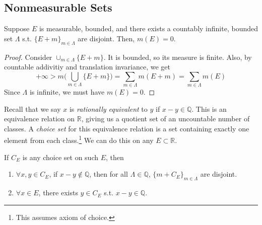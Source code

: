\subsection{Nonmeasurable Sets} 

  \begin{lemma}
    Suppose $E$ is measurable, bounded, and there exists a countably infinite, bounded set $\Lambda$ s.t. $\{E + m\}_{m\in \Lambda}$ are disjoint. Then, $m(E) = 0$. 
  \end{lemma}
  \begin{proof}
    Consider $\cup_{m\in \Lambda} \{E + m\}$. It is bounded, so its measure is finite. Also, by countable addivitiy and translation invariance, we get 
    \begin{equation}
      +\infty > m \bigg( \bigcup_{m\in \Lambda} \{E + m\} \bigg) = \sum_{m\in \Lambda} m (E + m) = \sum_{m\in \Lambda} m(E)
    \end{equation}
    Since $\Lambda$ is infinite, we must have $m(E) = 0$. 
  \end{proof}

  Recall that we say $x$ is \textit{rationally equivalent} to $y$ if $x - y \in \mathbb{Q}$. This is an equivalence relation on $\mathbb{R}$, giving us a quotient set of an uncountable number of classes. A \textit{choice set} for this equivalence relation is a set containing exactly one element from each class.\footnote{This assumes axiom of choice.} We can do this on any $E \subset \mathbb{R}$. 

  \begin{lemma} 
    If $C_E$ is any choice set on such $E$, then 
    \begin{enumerate}
      \item $\forall x, y \in C_E$, if $x - y \not\in \mathbb{Q}$, then for all $\Lambda \in \mathbb{Q}$, $\{m+ C_E\}_{m\in \Lambda}$ are disjoint. 
      \item $\forall x \in E$, there exists $y \in C_E$ s.t. $x - y \in \mathbb{Q}$. 
    \end{enumerate}
  \end{lemma}

